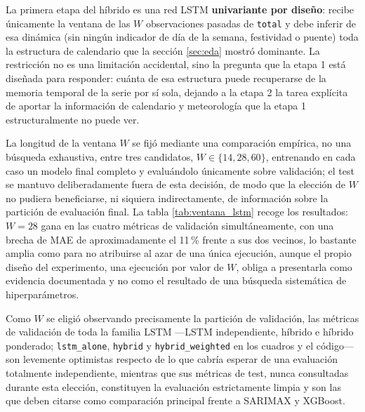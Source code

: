 La primera etapa del híbrido es una red LSTM \parencite{hochreiter1997lstm}
\textbf{univariante por diseño}: recibe únicamente la ventana de las $W$ observaciones
pasadas de \texttt{total} y debe inferir de esa dinámica (sin ningún indicador de día de
la semana, festividad o puente) toda la estructura de calendario que la sección
\ref{sec:eda} mostró dominante. La restricción no es una limitación accidental, sino la
pregunta que la etapa 1 está diseñada para responder: cuánta de esa estructura puede
recuperarse de la memoria temporal de la serie por sí sola, dejando a la etapa 2 la tarea
explícita de aportar la información de calendario y meteorología que la etapa 1
estructuralmente no puede ver.

La longitud de la ventana $W$ se fijó mediante una comparación empírica, no una búsqueda
exhaustiva, entre tres candidatos, $W \in \{14, 28, 60\}$, entrenando en cada caso un
modelo final completo y evaluándolo únicamente sobre validación; el test se mantuvo
deliberadamente fuera de esta decisión, de modo que la elección de $W$ no pudiera
beneficiarse, ni siquiera indirectamente, de información sobre la partición de evaluación
final. La tabla \ref{tab:ventana_lstm} recoge los resultados: $W=28$ gana en las cuatro
métricas de validación simultáneamente, con una brecha de MAE de aproximadamente el
11\,\% frente a sus dos vecinos, lo bastante amplia como para no atribuirse al azar de
una única ejecución, aunque el propio diseño del experimento, una ejecución por valor de
$W$, obliga a presentarla como evidencia documentada y no como el resultado de una
búsqueda sistemática de hiperparámetros.

\begin{table}[htbp]
  \centering
  \small
  \setlength{\tabcolsep}{4pt}
  \resizebox{\textwidth}{!}{%
  }
  \caption{}
  \label{tab:ventana_lstm}
\end{table}

Como $W$ se eligió observando precisamente la partición de validación, las métricas de
validación de toda la familia LSTM —LSTM independiente, híbrido e híbrido ponderado;
\texttt{lstm\_alone}, \texttt{hybrid} y \texttt{hybrid\_weighted} en los cuadros y el
código— son levemente optimistas respecto de lo que cabría esperar de una evaluación
totalmente independiente, mientras que sus métricas de test, nunca consultadas durante
esta elección, constituyen la evaluación estrictamente limpia y son las que deben citarse
como comparación principal frente a SARIMAX y XGBoost.

